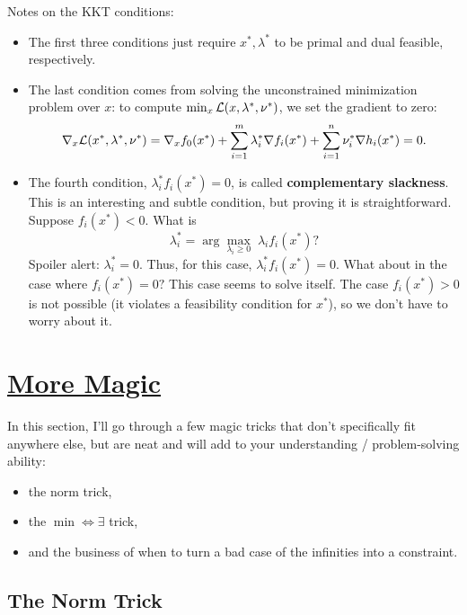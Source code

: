 \documentclass[12pt]{article}
\begin{document}
Notes on the KKT conditions: 
%
\begin{itemize}
\item The first three conditions just require $x^*, \lambda^*$ to be primal and dual feasible, respectively.
\item The last condition comes from solving the unconstrained minimization problem over $x$: to compute $
\min_x {\mathcal L}(x,\lambda^*,\nu^*)$, we set the gradient to zero:
%
\begin{equation*}
\nabla_x {\mathcal L} (x^*, \lambda^*, \nu^*) = \nabla_x f_0 (x^*) + \sum_{i=1}^m \lambda_i^* \nabla f_i(x^*) + \sum_{i=1}^n \nu_i^* \nabla h_i (x^*) = 0.
\end{equation*}
\item The fourth condition, $\lambda_i^* f_i (x^*) = 0$, is called \textbf{complementary slackness}. This is an interesting and subtle condition, but proving it is straightforward. Suppose $f_i (x^*) < 0$. What is 
%
\begin{equation*}
\lambda_i^* = \arg \max_{\lambda_i \geq 0} \; \lambda_i f_i (x^*)?
\end{equation*}
%
Spoiler alert: $\lambda_i^* = 0$. Thus, for this case, $\lambda_i^* f_i (x^*) = 0$. What about in the case where $f_i (x^*) = 0?$ This case seems to solve itself. The case $f_i (x^*) > 0$ is not possible (it violates a feasibility condition for $x^*$), so we don't have to worry about it. 

\end{itemize}


\pagebreak

\section{\href{http://catb.org/jargon/html/magic-story.html}{More Magic}}

In this section, I'll go through a few magic tricks that don't specifically fit anywhere else, but are neat and will add to your understanding / problem-solving ability:
%
\begin{itemize}
\item the norm trick,
\item the $\min \Leftrightarrow \exists$ trick,
\item and the business of when to turn a bad case of the infinities into a constraint. 
\end{itemize}

\subsection{The Norm Trick}
\end{document}
